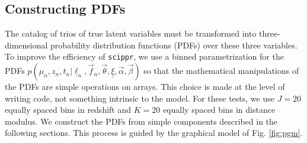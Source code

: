 \documentclass[12pt, onecolumn]{emulateapj}
\newcommand{\textul}{\underline}
\newcommand{\scippr}{\texttt{scippr}}
\begin{document}
%
%
%

\subsection{Constructing PDFs}
\label{sec:pdfs}

The catalog of trios of true latent variables must be transformed into three-dimensional probability distribution functions (PDFs) over these three variables.  To improve the efficiency of \scippr, we use a binned parametrization for the PDFs $p(\mu_{n}, z_{n}, t_{n} | \textul{\ell}_{n}, \vec{f}_{n}, \vec{\theta}, \textul{\xi}, \vec{\alpha}, \vec{\beta})$ so that the mathematical manipulations of the PDFs are simple operations on arrays.  This choice is made at the level of writing code, not something intrinsic to the model.  For these tests, we use $J=20$ equally spaced bins in redshift and $K=20$ equally spaced bins in distance modulus.  We construct the PDFs from simple components described in the following sections.  This process is guided by the graphical model of Fig. \ref{fig:pgm}.
\end{document}
